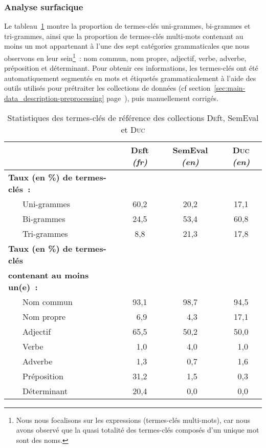      \subsubsection{Analyse surfacique}
      \label{subsubsec:main:domain_independent_keyphrase_extraction-keyphrase_candidate_selection-analysis_of_keyphrase_properties-shalow_analysis}
      Le tableau~\ref{tab:candidate_selection-train_stats} montre la
      proportion de termes-clés uni-grammes, bi-grammes et tri-grammes, ainsi
      que la proportion de termes-clés multi-mots contenant au moins un mot
      appartenant à l'une des sept catégories grammaticales que nous observons
      en leur sein\footnote{ Nous nous focalisons sur les expressions
      (termes-clés multi-mots), car nous avons observé que la quasi totalité des
      termes-clés composés d'un unique mot sont des noms. }~: nom commun, nom
      propre, adjectif, verbe, adverbe, préposition et déterminant. Pour obtenir
      ces informations, les termes-clés ont été automatiquement segmentés en
      mots et étiquetés grammaticalement à l'aide des outils utilisés pour
      prétraiter les collections de données (cf
      section~\ref{sec:main-data_description-preprocessing}
      page~\pageref{sec:main-data_description-preprocessing}), puis manuellement
      corrigés.
      \begin{table}[!h]
        \centering
        \begin{tabular}{ll|ccc}
          \toprule
          & & \textbf{\textsc{De}ft} \textit{(fr)} & \textbf{SemEval} \textit{(en)} & \textbf{\textsc{Duc}} \textit{(en)}\\
          \hline
          \multicolumn{2}{l|}{\textbf{Taux (en \%) de termes-clés~:}}\\
          & Uni-grammes & 60,2 & 20,2 & 17,1\\
          & Bi-grammes & 24,5 & 53,4 & 60,8\\
          & Tri-grammes & 8,8 & 21,3 & 17,8\\
          \hline
          \multicolumn{2}{l|}{\textbf{Taux (en \%) de termes-clés}} & & &\\
          \multicolumn{2}{l|}{\textbf{contenant au moins un(e)~:}} & & &\\
          & Nom commun & 93,1 & 98,7 & 94,5\\
          & Nom propre & $~~$6,9 & $~~$4,3 & 17,1\\
          & Adjectif & 65,5 & 50,2 & 50,0\\
          & Verbe & $~~$1,0 & $~~$4,0 & $~~$1,0\\
          & Adverbe & $~~$1,3 & $~~$0,7 & $~~$1,6\\
          & Préposition & 31,2 & $~~$1,5 & $~~$0,3\\
          & Déterminant & 20,4 & $~~$0,0 & $~~$0,0\\
          \bottomrule
        \end{tabular}
        \caption{Statistiques des termes-clés de référence des
                 collections \textsc{De}ft, SemEval et \textsc{Duc}
                 \label{tab:candidate_selection-train_stats}}
      \end{table}

